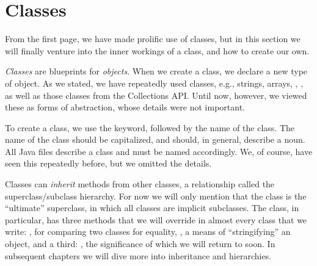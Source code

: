 \section{Classes}
From the first page, we have made prolific use of classes, but in this section we will finally venture into the inner workings of a class, and how to create our own.

\textit{Classes} are blueprints for \textit{objects}. When we create a class, we declare a new type of object. As we stated, we have repeatedly used classes, e.g., strings, arrays, , , as well as those classes from the Collections API. Until now, however, we viewed these as forms of abstraction, whose details were not important. 

To create a class, we use the  keyword, followed by the name of the class. The name of the class should be capitalized, and should, in general, describe a noun. All Java files describe a class and must be named accordingly. We, of course, have seen this repeatedly before, but we omitted the details.

Classes can \textit{inherit} methods from other classes, a relationship called the superclass/subclass hierarchy. For now we will only mention that the  class is the ``ultimate'' superclass, in which all classes are implicit subclasses. The  class, in particular, has three methods that we will override in almost every class that we write: , for comparing two classes for equality, , a means of ``stringifying'' an object, and a third: , the significance of which we will return to soon. In subsequent chapters we will dive more into inheritance and hierarchies.


